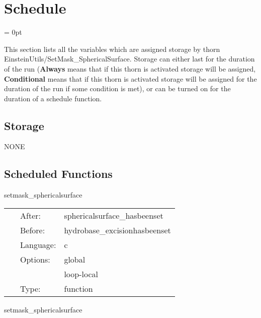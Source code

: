 
\section{Schedule} 


\parskip = 0pt


\noindent This section lists all the variables which are assigned storage by thorn EinsteinUtils/SetMask\_SphericalSurface.  Storage can either last for the duration of the run ({\bf Always} means that if this thorn is activated storage will be assigned, {\bf Conditional} means that if this thorn is activated storage will be assigned for the duration of the run if some condition is met), or can be turned on for the duration of a schedule function.


\subsection*{Storage}NONE
\subsection*{Scheduled Functions}
\vspace{5mm}


\hspace{5mm} setmask\_sphericalsurface 

\hspace{5mm}{\it set hydro\_excision\_mask according to spherical surface information } 


\hspace{5mm}

 \begin{tabular*}{160mm}{cll} 
~ & After:  & sphericalsurface\_hasbeenset \\ 
~ & Before:  & hydrobase\_excisionhasbeenset \\ 
~ & Language:  & c \\ 
~ & Options:  & global \\ 
~& ~ &loop-local\\ 
~ & Type:  & function \\ 
\end{tabular*} 


\vspace{5mm}


\hspace{5mm} setmask\_sphericalsurface 

